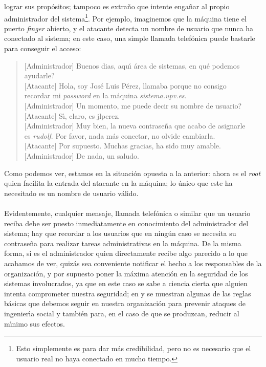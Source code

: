 lograr sus prop\'ositos; tampoco es extra\~no que intente enga\~nar al 
propio administrador del sistema\footnote{Esto simplemente es para dar m\'as
credibilidad, pero no es necesario que el usuario real no haya conectado en
mucho tiempo.}. Por ejemplo, imaginemos que la m\'aquina
tiene el puerto {\it finger} abierto, y el atacante detecta un nombre de 
usuario que nunca ha conectado al sistema; en este caso, una simple llamada 
telef\'onica puede bastarle para conseguir el acceso:
\tt
\begin{quote}
$[$Administrador$]$ Buenos dias, aqu\'{\i} \'area de sistemas, en qu\'e 
podemos\\
ayudarle?\\
$[$Atacante$]$ Hola, soy Jos\'e Luis P\'erez, llamaba porque no consigo\\
recordar mi {\it password} en la m\'aquina {\it sistema.upv.es}.\\
$[$Administrador$]$ Un momento, me puede decir su nombre de usuario?\\
$[$Atacante$]$ S\'{\i}, claro, es jlperez.\\
$[$Administrador$]$ Muy bien, la nueva contrase\~na que acabo de asignarle\\
es {\it rudolf}. Por favor, nada m\'as conectar, no olvide cambiarla.\\
$[$Atacante$]$ Por supuesto. Muchas gracias, ha sido muy amable.\\
$[$Administrador$]$ De nada, un saludo.
\end{quote}
\rm
Como podemos ver, estamos en la situaci\'on opuesta a la anterior: ahora es
el {\it root} quien facilita la entrada del atacante en la m\'aquina; lo \'unico
que este ha necesitado es un nombre de usuario v\'alido.\\
\\Evidentemente, cualquier mensaje, llamada telef\'onica o similar que un 
usuario reciba debe ser puesto inmediatamente en conocimiento del administrador
del sistema; hay que recordar a los usuarios que en ning\'un caso se necesita 
su contrase\~na para realizar tareas administrativas en la m\'aquina. De la
misma forma, si es el administrador quien directamente recibe algo parecido a
lo que acabamos de ver, quiz\'as sea conveniente notificar el hecho a los
responsables de la organizaci\'on, y por supuesto poner la m\'axima atenci\'on
en la seguridad de los sistemas involucrados, ya que en este caso se sabe a
ciencia cierta que alguien intenta comprometer nuestra seguridad; en 
\cite{kn:rad97} y \cite{kn:win95} se muestran algunas de las reglas b\'asicas 
que debemos 
seguir en nuestra organizaci\'on para prevenir ataques de ingenier\'{\i}a social
y tambi\'en para, en el caso de que se produzcan, reducir al m\'{\i}nimo sus
efectos.
